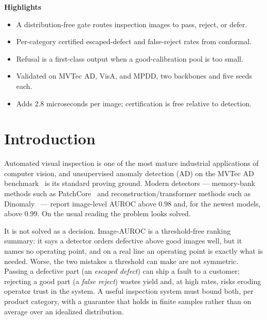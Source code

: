 \documentclass[preprint,11pt]{elsarticle}
\begin{document}
\noindent\textbf{Highlights}
\begin{itemize}\setlength{\itemsep}{0pt}
  \item A distribution-free gate routes inspection images to pass, reject, or defer.
  \item Per-category certified escaped-defect and false-reject rates from conformal.
  \item Refusal is a first-class output when a good-calibration pool is too small.
  \item Validated on MVTec AD, VisA, and MPDD, two backbones and five seeds each.
  \item Adds 2.8 microseconds per image; certification is free relative to detection.
\end{itemize}

\section{Introduction}
\label{sec:intro}

Automated visual inspection is one of the most mature industrial applications of computer vision,
and unsupervised anomaly detection (AD) on the MVTec AD benchmark~\citep{bergmann2019mvtec} is its
standard proving ground. Modern detectors --- memory-bank methods such as
PatchCore~\citep{roth2022patchcore} and reconstruction/transformer methods such as
Dinomaly~\citep{guo2025dinomaly} --- report image-level AUROC above $0.98$ and, for the newest
models, above $0.99$. On the usual reading the problem looks solved.

It is not solved as a decision. Image-AUROC is a threshold-free ranking summary: it says a
detector orders defective above good images well, but it names no operating point, and on a real
line an operating point is exactly what is needed. Worse, the two mistakes a threshold can make
are not symmetric. Passing a defective part (an \emph{escaped defect}) can ship a fault to a
customer; rejecting a good part (a \emph{false reject}) wastes yield and, at high rates, risks
eroding operator trust in the system. A useful inspection system must bound both, per
product category, with a guarantee that holds in finite samples rather than on average over an
idealized distribution.
\end{document}
